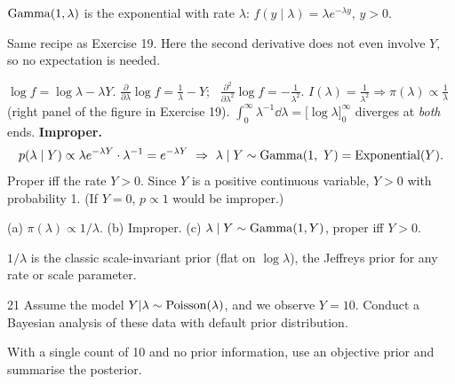 \documentclass[11pt]{article}
\begin{document}
\begin{recall}
$\mathrm{Gamma}(1,\lambda)$ is the exponential with rate $\lambda$: $f(y\mid\lambda)=\lambda e^{-\lambda y}$, $y>0$.
\end{recall}

\begin{keyidea}
Same recipe as Exercise 19. Here the second derivative does not even involve $Y$, so no expectation is needed.
\end{keyidea}

\solution
{} $\log f=\log\lambda-\lambda Y$.
 $\frac{\partial}{\partial\lambda}\log f=\frac1\lambda-Y$; \ $\frac{\partial^2}{\partial\lambda^2}\log f=-\frac{1}{\lambda^2}$.
 $I(\lambda)=\frac1{\lambda^2}\Rightarrow\pi(\lambda)\propto\frac1\lambda$ (right panel of the figure in Exercise 19).
 $\int_0^\infty\lambda^{-1}\dd\lambda=\big[\log\lambda\big]_0^\infty$ diverges at \emph{both} ends. \textbf{Improper.}
\[
p(\lambda\mid Y)\propto\lambda e^{-\lambda Y}\cdot\lambda^{-1}=e^{-\lambda Y}\ \Rightarrow\ \lambda\mid Y\sim\mathrm{Gamma}(1,\ Y)=\mathrm{Exponential}(Y).
\]
Proper iff the rate $Y>0$. Since $Y$ is a positive continuous variable, $Y>0$ with probability 1. (If $Y=0$, $p\propto1$ would be improper.)

\begin{answer}
(a) $\pi(\lambda)\propto1/\lambda$. \quad (b) Improper. \quad (c) $\lambda\mid Y\sim\mathrm{Gamma}(1,Y)$, proper iff $Y>0$.
\end{answer}

\begin{takeaway}
$1/\lambda$ is the classic scale-invariant prior (flat on $\log\lambda$), the Jeffreys prior for any rate or scale parameter.
\end{takeaway}


\begin{problem}{21}
Assume the model $Y|\lambda\sim\mathrm{Poisson}(\lambda)$, and we observe $Y=10$. Conduct a Bayesian analysis of these data with default prior distribution.
\end{problem}

\begin{restate}
With a single count of 10 and no prior information, use an objective prior and summarise the posterior.
\end{restate}
\end{document}
